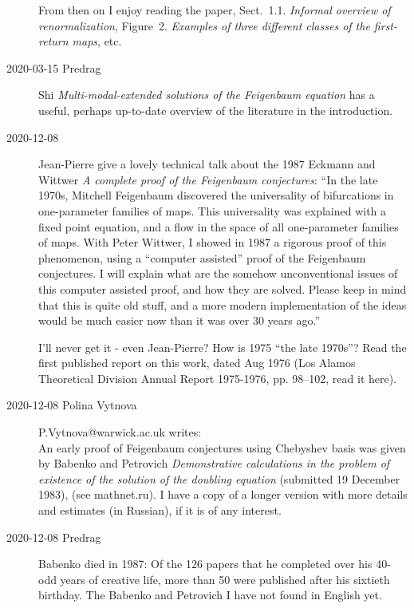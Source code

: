 \begin{description}
From then on I enjoy reading the paper, Sect.~1.1. {\em Informal overview
of renormalization}, Figure~2. \emph{Examples of three different classes
of the first-return maps}, etc.

\item[2020-03-15 Predrag] Shi {\em Multi-modal-extended
solutions of the {Feigenbaum} equation} has a useful, perhaps up-to-date
overview of the literature in the introduction.


\item[2020-12-08] Jean-Pierre give a lovely
 {technical talk} about
the 1987 Eckmann and Wittwer
{\em A complete proof of the {Feigenbaum} conjectures}:
``In the late 1970s, Mitchell Feigenbaum discovered the universality of
bifurcations in one-parameter families of maps. This universality was
explained with a fixed point equation, and a flow in the space of all
one-parameter families of maps. With Peter Wittwer, I showed in 1987 a
rigorous proof of this phenomenon, using a ``computer assisted'' proof of
the Feigenbaum conjectures. I will explain what are the somehow
unconventional issues of this computer assisted proof, and how they are
solved. Please keep in mind that this is quite old stuff, and a more
modern implementation of the ideas would be much easier now than it was
over 30 years ago.''

I'll never get it - even Jean-Pierre? How is 1975 ``the late 1970s''?
Read the first published report on this work, dated Aug 1976 (Los Alamos
Theoretical Division Annual Report 1975-1976, pp. 98--102,
 {read it here}).


\item[2020-12-08 Polina Vytnova] P.Vytnova@warwick.ac.uk writes:\\
An early proof of Feigenbaum conjectures using Chebyshev basis was given by
Babenko and Petrovich {\em Demonstrative calculations in the
problem of existence of the solution of the doubling equation}
(submitted 19 December 1983),
{(see mathnet.ru)}.
I have a copy of a longer version with more details and estimates (in
Russian), if it is of any interest.

\item[2020-12-08 Predrag]
{Babenko died in 1987}: Of  the 126  papers  that  he  completed  over
his  40-odd  years  of  creative  life,  more than  50  were  published
after  his  sixtieth  birthday. The Babenko and Petrovich
I have not found in English yet.


\end{description}
